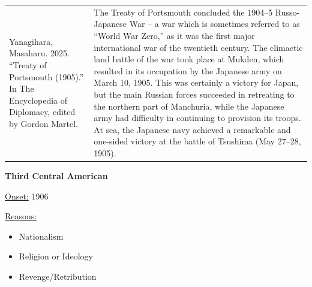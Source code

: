 {\begin{longtable}{p{}p{}}
\\
Yanagihara, Masaharu. 2025. “Treaty of Portsmouth (1905).” In The Encyclopedia of Diplomacy, edited by Gordon Martel. & The Treaty of Portsmouth concluded the 1904–5 Russo-Japanese War – a war which is sometimes referred to as “World War Zero,” as it was the first major international war of the twentieth century. The climactic land battle of the war took place at Mukden, which resulted in its occupation by the Japanese army on March 10, 1905. This was certainly a victory for Japan, but the main Russian forces succeeded in retreating to the northern part of Manchuria, while the Japanese army had difficulty in continuing to provision its troops. At sea, the Japanese navy achieved a remarkable and one-sided victory at the battle of Tsushima (May 27–28, 1905).
\\
\end{longtable}}
\clearpage
         \textbf{Third Central American} 

          \underline{Onset:} 1906         

\underline{Reasons:}
\begin{itemize}
\item Nationalism
\item Religion or Ideology
\item Revenge/Retribution
\end{itemize}

